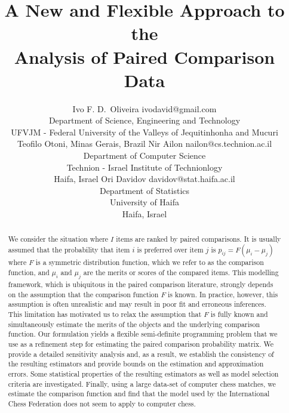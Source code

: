 \documentclass[twoside,11pt]{article}
\begin{document}
\title{A New and Flexible Approach to the \\ Analysis of Paired Comparison Data}



\author{\name Ivo F. D.\ Oliveira \email ivodavid@gmail.com \\
       \addr Department of Science, Engineering and Technology\\
       UFVJM - Federal University of the Valleys of Jequitinhonha and Mucuri\\
       Teofilo Otoni, Minas Gerais, Brazil
       \AND
       \name Nir Ailon \email nailon@cs.technion.ac.il \\
       \addr Department of Computer Science\\
       Technion - Israel Institute of Technionlogy\\
       Haifa, Israel
       \AND
       \name Ori Davidov \email davidov@stat.haifa.ac.il \\
       \addr Department of Statistics\\
       University of Haifa\\
       Haifa, Israel}


\maketitle

\begin{abstract}%
We consider the situation where $I$ items are ranked by paired comparisons. It is usually assumed that the probability that item $i$ is preferred over item $j$ is $p_{ij}=F(\mu_i-\mu_j)$ where $F$ is a symmetric distribution function, which we refer to as the comparison function, and $\mu_i$ and $\mu_j$ are the merits or scores of the compared items. This modelling framework, which is ubiquitous in the paired comparison literature, strongly depends on the assumption that the comparison function $F$ is known. In practice, however, this assumption is often unrealistic and may result in poor fit and erroneous inferences. This limitation has motivated us to relax the assumption that $F$ is fully known and simultaneously estimate the merits of the objects and the underlying comparison function. Our formulation yields a flexible semi-definite programming problem that we use as a refinement step for estimating the paired comparison probability matrix. We provide a detailed  sensitivity analysis and, as a result, we establish the consistency of the resulting estimators and provide bounds on the estimation and approximation errors. Some statistical properties of the resulting estimators as well as model selection criteria are investigated. Finally, using a large data-set of computer chess matches, we estimate the comparison function and find that the model used by the International Chess Federation does not seem to apply to computer chess.  
 \end{abstract}
\end{document}
